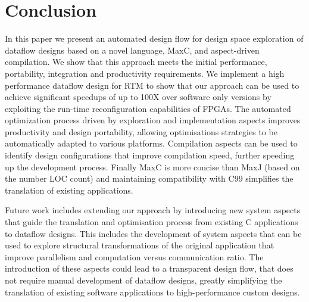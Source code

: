 \section{Conclusion}

In this paper we present an automated design flow for design space
exploration of dataflow designs based on a novel language, MaxC, and
aspect-driven compilation. We show that this approach meets the
initial performance, portability, integration and productivity
requirements. We implement a high performance dataflow design for RTM
to show that our approach can be used to achieve significant speedups
of up to 100X over software only versions by exploiting the run-time
reconfiguration capabilities of FPGAs. The automated optimization
process driven by exploration and implementation aspects improves
productivity and design portability, allowing optimisations strategies
to be automatically adapted to various platforms. Compilation aspects
can be used to identify design configurations that improve compilation
speed, further speeding up the development process. Finally MaxC is
more concise than MaxJ (based on the number LOC count) and maintaining
compatibility with C99 simplifies the translation of existing
applications.

Future work includes extending our approach by introducing new system
aspects that guide the translation and optimisation process from
existing C applications to dataflow designs. This includes the
development of system aspects that can be used to explore structural
transformations of the original application that improve parallelism
and computation versus communication ratio. The introduction of these
aspects could lead to a transparent design flow, that does not require
manual development of dataflow designs, greatly simplifying the
translation of existing software applications to high-performance
custom designs.
